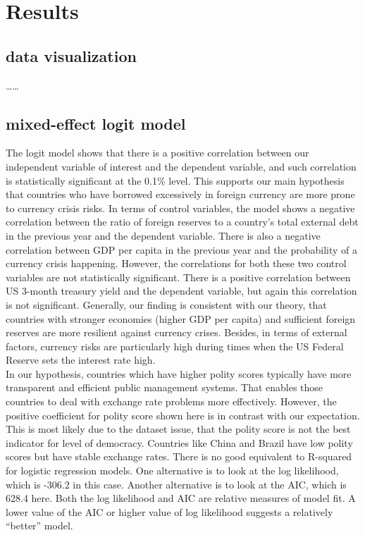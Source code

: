 \documentclass[12pt,]{article}
\begin{document}
\section{Results}\label{results}

\subsection{data visualization}\label{data-visualization-1}

\ldots{}\ldots{}

\subsection{mixed-effect logit model}\label{mixed-effect-logit-model-1}

The logit model shows that there is a positive correlation between our
independent variable of interest and the dependent variable, and such
correlation is statistically significant at the 0.1\% level. This
supports our main hypothesis that countries who have borrowed
excessively in foreign currency are more prone to currency crisis risks.
In terms of control variables, the model shows a negative correlation
between the ratio of foreign reserves to a country's total external debt
in the previous year and the dependent variable. There is also a
negative correlation between GDP per capita in the previous year and the
probability of a currency crisis happening. However, the correlations
for both these two control variables are not statistically significant.
There is a positive correlation between US 3-month treasury yield and
the dependent variable, but again this correlation is not significant.
Generally, our finding is consistent with our theory, that countries
with stronger economies (higher GDP per capita) and sufficient foreign
reserves are more resilient against currency crises. Besides, in terms
of external factors, currency risks are particularly high during times
when the US Federal Reserve sets the interest rate high.\\
In our hypothesis, countries which have higher polity scores typically
have more transparent and efficient public management systems. That
enables those countries to deal with exchange rate problems more
effectively. However, the positive coefficient for polity score shown
here is in contrast with our expectation. This is most likely due to the
dataset issue, that the polity score is not the best indicator for level
of democracy. Countries like China and Brazil have low polity scores but
have stable exchange rates. There is no good equivalent to R-squared for
logistic regression models. One alternative is to look at the log
likelihood, which is -306.2 in this case. Another alternative is to look
at the AIC, which is 628.4 here. Both the log likelihood and AIC are
relative measures of model fit. A lower value of the AIC or higher value
of log likelihood suggests a relatively ``better'' model.
\end{document}
